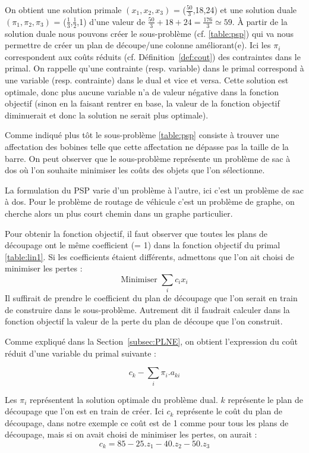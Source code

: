 On obtient une solution primale $(x_1,x_2,x_3)$ = ($\frac{50}{3}$,18,24) et une solution duale $(\pi_1,\pi_2,\pi_3) $ = ($\frac{1}{3}$,$\frac{1}{2}$,1) d'une valeur de $\frac{50}{3} + 18 + 24 = \frac{176}{3}  \simeq 59$.
\`{A} partir de la solution duale nous pouvons créer le sous-problème (cf. \ref{table:psp}) qui va nous permettre de créer un plan de découpe/une colonne améliorant(e).
Ici les $\pi_i$ correspondent aux coûts réduits (cf. Définition~\ref{def:cout}) des contraintes dans le primal.
On rappelle qu'une contrainte (resp. variable) dans le primal correspond à une variable (resp. contrainte) dans le dual et vice et versa. 
Cette solution est optimale, donc plus aucune variable n'a de valeur négative dans la fonction objectif (sinon en la faisant rentrer en base, la valeur de la fonction objectif diminuerait et donc la solution ne serait plus optimale).

Comme indiqué plus tôt le sous-problème \ref{table:psp} consiste à trouver une affectation des bobines telle que cette affectation ne dépasse pas la taille de la barre. 
On peut observer que le sous-problème représente un problème de sac à dos où l'on souhaite minimiser les coûts des objets que  l'on sélectionne.

La formulation du PSP varie d'un problème à l'autre, ici c'est un problème de sac à dos. Pour le problème de routage de véhicule c'est un problème de graphe, on cherche alors un plus court chemin dans un graphe particulier.


Pour obtenir la fonction objectif, il faut observer que toutes les plans de découpage ont le même coefficient (= 1) dans la fonction objectif du primal \ref{table:lin1}. 
Si les coefficients étaient différents, admettons que l'on ait choisi de minimiser les pertes :
$$\text{Minimiser } \sum_{i}c_ix_i$$
Il suffirait de prendre le coefficient du plan de découpage que l'on serait en train de construire dans le sous-problème. Autrement dit il faudrait calculer dans la fonction objectif la valeur de la perte du plan de découpe que l'on construit.

Comme expliqué dans la Section~\ref{subsec:PLNE}, on obtient l'expression du coût réduit d'une variable du primal suivante :

$$c_k - \sum_i \pi_i.a_{ki}$$



Les $\pi_i$ représentent la solution optimale du problème dual.
$k$ représente le plan de découpage que l'on est en train de créer.
Ici $c_k$ représente le coût du plan de découpage, dans notre exemple ce coût est de 1 comme pour tous les plans de découpage, mais si on avait choisi de minimiser les pertes, on aurait :
$$
c_k = 85 - 25.z_1 - 40.z_2 - 50.z_3 
$$


